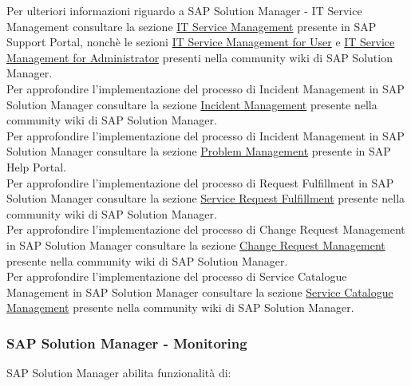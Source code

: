 Per ulteriori informazioni riguardo a SAP Solution Manager - IT Service Management consultare la sezione \href{https://support.sap.com/en/solution-manager/solution-manager-71/processes-71/it-service-management.html}{IT Service Management} presente in SAP Support Portal, nonchè le sezioni \href{https://wiki.scn.sap.com/wiki/display/SAPITSM/IT+Service+Management+Wiki+for+User}{IT Service Management for User} e \href{https://wiki.scn.sap.com/wiki/display/SAPITSM/ITSM+Wiki+for+Administrator}{IT Service Management for Administrator} presenti nella community wiki di SAP Solution Manager.
\\
Per approfondire l'implementazione del processo di Incident Management in SAP Solution Manager consultare la sezione \href{https://wiki.scn.sap.com/wiki/display/SM/Incident+Management+Overview}{Incident Management} presente nella community wiki di SAP Solution Manager.
\\
Per approfondire l'implementazione del processo di Incident Management in SAP Solution Manager consultare la sezione \href{https://help.sap.com/viewer/0611cd2e5d1e403c9ee7b6efad89e81b/7.2.07/en-US/1f35fb5cda804e71bfcf5c00326eb1fa.html}{Problem Management} presente in SAP Help Portal.
\\
Per approfondire l'implementazione del processo di Request Fulfillment in SAP Solution Manager consultare la sezione \href{https://wiki.scn.sap.com/wiki/display/SAPITSM/Service+Request+Management+Service+Request+Fulfillment}{Service Request Fulfillment} presente nella community wiki di SAP Solution Manager.
\\
Per approfondire l'implementazione del processo di Change Request Management in SAP Solution Manager consultare la sezione \href{https://wiki.scn.sap.com/wiki/display/SM/Change+Request+Management+Overview}{Change Request Management} presente nella community wiki di SAP Solution Manager.
\\
Per approfondire l'implementazione del processo di Service Catalogue Management in SAP Solution Manager consultare la sezione \href{https://wiki.scn.sap.com/wiki/display/SAPITSM/Service+Catalogue+Management}{Service Catalogue Management} presente nella community wiki di SAP Solution Manager.

\subsubsection{SAP Solution Manager - Monitoring}

SAP Solution Manager abilita funzionalità di:

